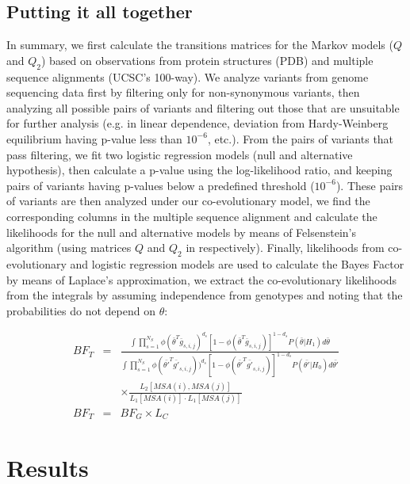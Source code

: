\subsection{Putting it all together}

In summary, we first calculate the transitions matrices for the Markov models ($Q$ and $Q_2$) based on observations from protein structures (PDB) and multiple sequence alignments (UCSC's 100-way). We analyze variants from genome sequencing data first by filtering only for non-synonymous variants, then analyzing all possible pairs of variants and filtering out those that are unsuitable for further analysis (e.g. in linear dependence, deviation from Hardy-Weinberg equilibrium having p-value less than $10^{-6}$, etc.). From the pairs of variants that pass filtering, we fit two logistic regression models (null and alternative hypothesis), then calculate a p-value using the log-likelihood ratio, and keeping pairs of variants having p-values below a predefined threshold ($10^{-6}$). These pairs of variants are then analyzed under our co-evolutionary model, we find the corresponding columns in the multiple sequence alignment and calculate the likelihoods for the null and alternative models by means of Felsenstein's algorithm (using matrices $Q$ and $Q_2$ in respectively). Finally, likelihoods from co-evolutionary and logistic regression models are used to calculate the Bayes Factor by means of Laplace's approximation, we extract the co-evolutionary likelihoods from the integrals by assuming independence from genotypes and noting that the probabilities do not depend on $\theta$:

\begin{eqnarray*}\label{eq:bftot}
	BF_T & = & \frac
	{ \int{ \prod_{s=1}^{N_S}{ \phi( \bar{\theta}^T \bar{g}_{s,i,j})^{d_s} [ 1-\phi( \bar{\theta}^T \bar{g}_{s,i,j}) ]^{1-d_s} } P( \bar{\theta} | H_1)  d\bar{\theta} } }
	{ \int{ \prod_{s=1}^{N_S}{ 
	\phi( \bar{\theta'}^T \bar{g'}_{s,i,j} ) )^{d_s} 
	[ 1-\phi( \bar{\theta'}^T \bar{g'}_{s,i,j}) ]^{1-d_s} } 
	P( \bar{\theta'} | H_0)  
	d\bar{\theta'} } } \\
	& & \times \frac{L_2[ MSA(i), MSA(j) ]}{L_1[MSA(i)] \cdot L_1[MSA(j)]} \\
	BF_T & = & BF_G \times L_C
\end{eqnarray*}

\section{Results}

